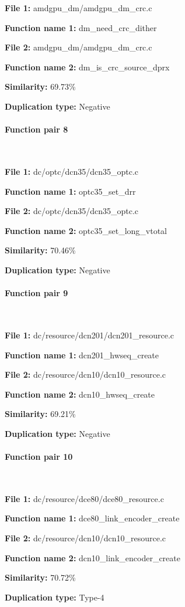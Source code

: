 \textbf{File 1:} amdgpu\_dm/amdgpu\_dm\_crc.c

\textbf{Function name 1:} dm\_need\_crc\_dither

\textbf{File 2:} amdgpu\_dm/amdgpu\_dm\_crc.c

\textbf{Function name 2:} dm\_is\_crc\_source\_dprx

\textbf{Similarity:} 69.73\%

\textbf{Duplication type:} Negative


\paragraph{Function pair 8 }  

\

\textbf{File 1:} dc/optc/dcn35/dcn35\_optc.c

\textbf{Function name 1:} optc35\_set\_drr

\textbf{File 2:} dc/optc/dcn35/dcn35\_optc.c

\textbf{Function name 2:} optc35\_set\_long\_vtotal

\textbf{Similarity:} 70.46\%

\textbf{Duplication type:} Negative


\paragraph{Function pair 9 }  

\

\textbf{File 1:} dc/resource/dcn201/dcn201\_resource.c

\textbf{Function name 1:} dcn201\_hwseq\_create

\textbf{File 2:} dc/resource/dcn10/dcn10\_resource.c

\textbf{Function name 2:} dcn10\_hwseq\_create

\textbf{Similarity:} 69.21\%

\textbf{Duplication type:} Negative


\paragraph{Function pair 10 }  

\

\textbf{File 1:} dc/resource/dce80/dce80\_resource.c

\textbf{Function name 1:} dce80\_link\_encoder\_create

\textbf{File 2:} dc/resource/dcn10/dcn10\_resource.c

\textbf{Function name 2:} dcn10\_link\_encoder\_create

\textbf{Similarity:} 70.72\%

\textbf{Duplication type:} Type-4



